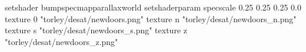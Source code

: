 setshader bumpspecmapparallaxworld
setshaderparam specscale 0.25 0.25 0.25 0.0
texture 0 "torley/desat/newdoors.png"
texture n "torley/desat/newdoors_n.png"
texture s "torley/desat/newdoors_s.png"
texture z "torley/desat/newdoors_z.png"

